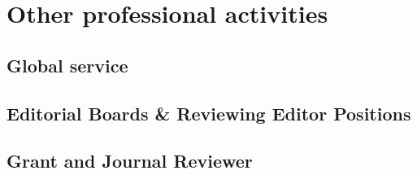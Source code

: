 \chapter{Other professional activities}
\label{CommunityService}

\vspace{-10mm}


\section{Global service}

\section{Editorial Boards \& Reviewing Editor Positions}

\section{Grant and Journal Reviewer}